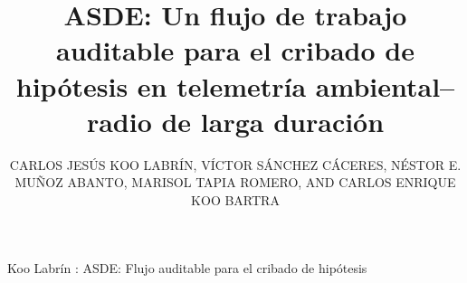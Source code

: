 \documentclass{ieeeaccess}
\begin{document}
\title{ASDE: Un flujo de trabajo auditable para el cribado de hipótesis en telemetría ambiental--radio de larga duración}
\author{\uppercase{Carlos Jes\'us Koo Labr\'in},
\uppercase{V\'ictor S\'anchez C\'aceres},
\uppercase{N\'estor E. Mu\~noz Abanto},
\uppercase{Marisol Tapia Romero}, AND
\uppercase{Carlos Enrique Koo Bartra}}
\address[1]{Universidad Nacional de Cajamarca, Cajamarca, Per\'u (correo electrónico: ckoo@unc.edu.pe)}
\address[2]{Universidad Privada del Norte, Trujillo, Per\'u}
{Koo Labr\'in \headeretal: ASDE: Flujo auditable para el cribado de hipótesis}
\end{document}
